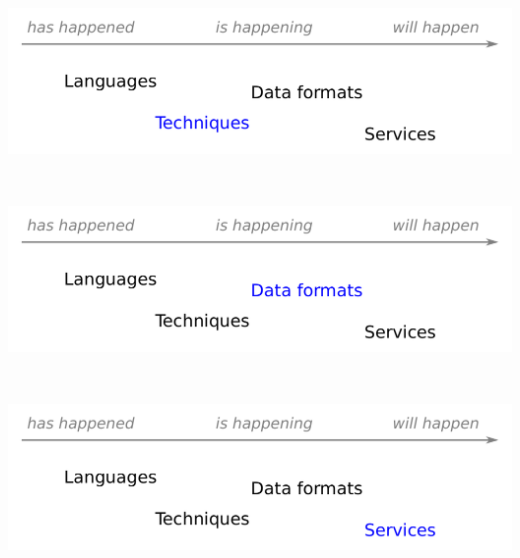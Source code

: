 \documentclass[aspectratio=169]{beamer}
\begin{document}
\begin{frame}{\mbox{ }}
\vspace{0.5 cm}

\begin{center}
\includegraphics[width=0.9\linewidth]{img/topics-2.pdf}
\end{center}
\end{frame}

\begin{frame}{\mbox{ }}
\vspace{0.5 cm}

\begin{center}
\includegraphics[width=0.9\linewidth]{img/topics-3.pdf}
\end{center}
\end{frame}

\begin{frame}{\mbox{ }}
\vspace{0.5 cm}

\begin{center}
\includegraphics[width=0.9\linewidth]{img/topics-4.pdf}
\end{center}
\end{frame}
\end{document}
